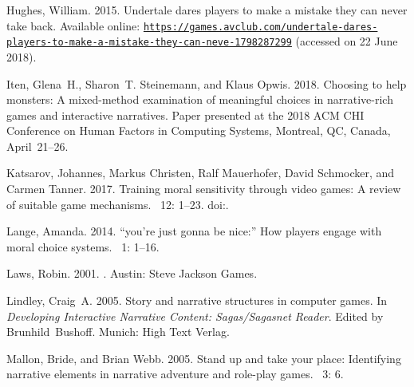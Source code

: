 \documentclass[arts,article,accept,moreauthors,pdftex,10pt,a4paper]{Definitions/mdpi}
\begin{document}
\begin{thebibliography}{999}
Hughes, William. 2015.%
\newblock Undertale dares players to make a mistake they can never take back.
\newblock Available online:
  \href{https://games.avclub.com/undertale-dares-players-to-make-a-mistake-they-can-neve-1798287299}{\nolinkurl{https://games.avclub.com/undertale-dares-players-to-make-a-mistake-they-can-neve-1798287299}}
  (accessed on 22 June 2018).


Iten, Glena~H., Sharon~T. Steinemann, and Klaus Opwis. 2018.
\newblock Choosing to help monsters: {A} mixed-method examination of meaningful
  choices in narrative-rich games and interactive narratives.
\newblock Paper presented at the 2018 ACM CHI Conference on Human Factors in Computing
  Systems, Montreal, QC, Canada, \mbox{April 21--26}.

Katsarov, Johannes, Markus Christen, Ralf Mauerhofer, David Schmocker, and
  Carmen Tanner. 2017.
\newblock Training moral sensitivity through video games: A review of suitable
  game mechanisms.
~{12\/}: 1--23.
\newblock
  doi:{\href{https://doi.org/10.1177/1555412017719344}{}}.

Lange, Amanda. 2014.
\newblock ``you're just gonna be nice:'' {H}ow players engage with moral choice
  systems.
~{1\/}: 1--16.

Laws, Robin. 2001.
.
\newblock Austin: Steve Jackson Games.

Lindley, Craig~A. 2005.
\newblock Story and narrative structures in computer games.
\newblock In {\em Developing Interactive Narrative Content:
  Sagas/Sagasnet Reader}. Edited by Brunhild~Bushoff. Munich: High Text Verlag.

Mallon, Bride, and Brian Webb. 2005.
\newblock Stand up and take your place: {I}dentifying narrative elements in
  narrative adventure and role-play games.
~{3\/}: 6.


\end{thebibliography}
\end{document}
